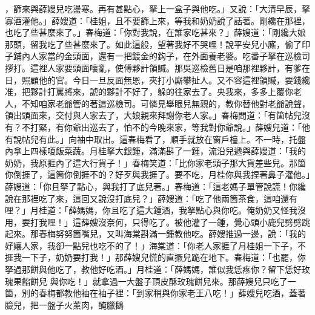 ，篩來與薛嫂兒吃盪寒。再有甚點心，拏上一盒子與他吃。」又說：「大清早辰，拏寡酒灌他。」薛嫂道：「桂姐，且不要篩上來，等我和奶奶說了話著。剛纔在那裡，也吃了些甚麼來了。」春梅道：「你對我說，在誰家吃甚來？」薛嫂道：「剛纔大娘那頭，留我吃了些甚麼來了。如此這般，望著我好不哭哩！說平安兒小廝，偷了印子鋪內人家當的金頭面，還有一把鍍金的鈎子，在外面養老婆。吃番子拏在巡檢司拶打。這裡人家要頭面嚷亂，使傅夥計領贓。那吳巡檢舊日是咱那裡夥計，有爹在日，照顧他的官。今日一旦反面無恩，夾打小廝攀扯人。又不容這裡領贓，要錢纔准，把夥計打罵將來，諕的夥計不好了，躲的往家去了。央我來，多多上覆你老人，不知咱家老爺管的著這巡檢司。可憐見舉眼兒無親的，教你替他對老爺說聲，領出頭面來，交付與人家去了，大娘親來拜謝你老人家。」春梅問道：「有箇帖兒沒有？不打緊，有你爺出巡去了，怕不的今晚來家，等我對你爺說。」薛嫂兒道：「他有說帖兒有此。」向袖中取出。這春梅看了，順手就放在窗戶檯上。不一時，托盤內拿上四樣嗄飯菜蔬。月桂拏大銀鍾，滿滿斟了一鍾，流沿兒遞與薛嫂道：「我的奶奶，我原捱內了這大行貨子！」春梅笑道：「比你家老頭子那大貨差些兒。那箇你倒捱了，這箇你倒捱不的？好歹與我捱了。要不吃，月桂你與我捏著鼻子灌他。」薛嫂道：「你且拏了點心，與我打了底兒著。」春梅道：「這老媽子單管說謊！你纔說在那裡吃了來，這回又說沒打底兒？」薛嫂道：「吃了他兩箇茶食，這咱還有哩？」月桂道：「薛媽媽，你且吃了這大鍾酒，我拏點心與你吃。俺奶奶又怪我沒用，要打我哩！」這薛嫂沒奈何，只得吃了。被他灌了一鍾，覺心頭小鹿兒劈劈跳起來。那春梅努努箇嘴兒，又叫海棠斟滿一鍾教他吃。薛嫂推過一邊，說：「我的好孃人家，我卻一點兒也吃不的了！」海棠道：「你老人家捱了月桂姐一下子，不捱我一下子，奶奶要打我！」那薛嫂兒慌的直撅兒跪在地下。春梅道：「也罷，你拏過那餅與他吃了，教他好吃酒。」月桂道：「薛媽媽，誰似我恁疼你？留下恁好玫瑰果餡餅兒 與你吃！」就拿過一大盤子頂皮酥玫瑰餅兒來。那薛嫂兒只吃了一箇，別的春梅都教他袖在袖子裡：「到家稍與你家老王八吃！」薛嫂兒吃酒，蓋著臉兒，把一盤子火薰肉，醃臘鵝 